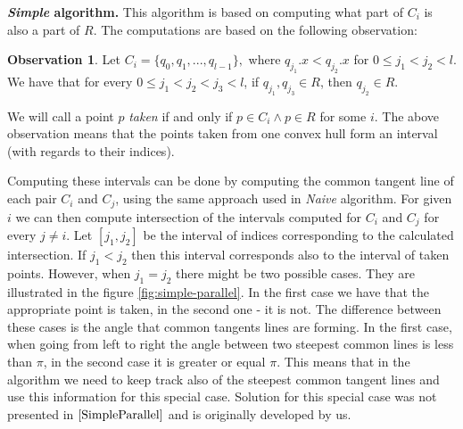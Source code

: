 \documentclass[letterpaper]{article}
\newcommand{\mypar}[1]{{\bf #1.}}
\theoremstyle{definition}
\newtheorem{observation}{Observation}
\begin{document}
\mypar{{\it Simple} algorithm}
This algorithm is based on computing what part of $C_i$ is also a part of $R$.
The computations are based on the following observation:
\begin{observation}
Let $C_i = \{q_0, q_1, ..., q_{l-1} \},$ where  $q_{j_1}.x < q_{j_2}.x$ for $0 \leq j_1 < j_2 < l$. 
We have that for every $0 \leq j_1 < j_2 < j_3 < l$, if $q_{j_1}, q_{j_3} \in R$, then $q_{j_2} \in R$.
\end{observation}
We will call a point $p$ {\it taken} if and only if $p \in C_i \land p \in R$ for some $i$. 
The above observation means that the points taken from one convex hull form an interval (with regards to their indices).

Computing these intervals can be done by computing the common tangent line of each pair $C_i$ and $C_j$, using the same approach used in {\it Naive} algorithm. 
For given $i$ we can then compute intersection of the intervals computed for $C_i$ and $C_j$ for every $j \neq i$.
Let $[j_1, j_2]$ be the interval of indices corresponding to the calculated intersection.
If $j_1 < j_2$ then this interval corresponds also to the interval of taken points.
However, when $j_1 = j_2$ there might be two possible cases.
They are illustrated in the figure \ref{fig:simple-parallel}.
In the first case we have that the appropriate point is taken, in the second one - it is not.
The difference between these cases is the angle that common tangents lines are forming.
In the first case, when going from left to right the angle between two steepest common lines is less than $\pi$, in the second case it is greater or equal $\pi$.
This means that in the algorithm we need to keep track also of the steepest common tangent lines and use this information for this special case.
Solution for this special case was not presented in $\cite{SimpleParallel}$ and is originally developed by us.
\end{document}
